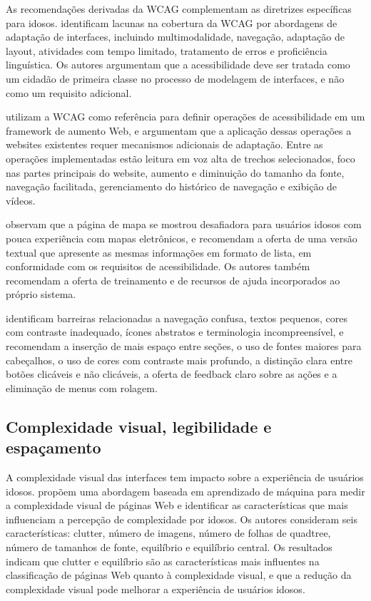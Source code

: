 \label{sec:recomendacoes_wcag}

As recomendações derivadas da WCAG complementam as diretrizes específicas para idosos. \cite{wickramathilaka2023addressing} identificam lacunas na cobertura da WCAG por abordagens de adaptação de interfaces, incluindo multimodalidade, navegação, adaptação de layout, atividades com tempo limitado, tratamento de erros e proficiência linguística. Os autores argumentam que a acessibilidade deve ser tratada como um cidadão de primeira classe no processo de modelagem de interfaces, e não como um requisito adicional.

\cite{gonzalez2025augmenting} utilizam a WCAG como referência para definir operações de acessibilidade em um framework de aumento Web, e argumentam que a aplicação dessas operações a websites existentes requer mecanismos adicionais de adaptação. Entre as operações implementadas estão leitura em voz alta de trechos selecionados, foco nas partes principais do website, aumento e diminuição do tamanho da fonte, navegação facilitada, gerenciamento do histórico de navegação e exibição de vídeos.

\cite{xie2010usability} observam que a página de mapa se mostrou desafiadora para usuários idosos com pouca experiência com mapas eletrônicos, e recomendam a oferta de uma versão textual que apresente as mesmas informações em formato de lista, em conformidade com os requisitos de acessibilidade. Os autores também recomendam a oferta de treinamento e de recursos de ajuda incorporados ao próprio sistema.

\cite{gatsou2017seniors} identificam barreiras relacionadas a navegação confusa, textos pequenos, cores com contraste inadequado, ícones abstratos e terminologia incompreensível, e recomendam a inserção de mais espaço entre seções, o uso de fontes maiores para cabeçalhos, o uso de cores com contraste mais profundo, a distinção clara entre botões clicáveis e não clicáveis, a oferta de feedback claro sobre as ações e a eliminação de menus com rolagem.

\subsection{Complexidade visual, legibilidade e espaçamento}

\label{sec:complexidade}

A complexidade visual das interfaces tem impacto sobre a experiência de usuários idosos. \cite{sadeghi2020hci} propõem uma abordagem baseada em aprendizado de máquina para medir a complexidade visual de páginas Web e identificar as características que mais influenciam a percepção de complexidade por idosos. Os autores consideram seis características: clutter, número de imagens, número de folhas de quadtree, número de tamanhos de fonte, equilíbrio e equilíbrio central. Os resultados indicam que clutter e equilíbrio são as características mais influentes na classificação de páginas Web quanto à complexidade visual, e que a redução da complexidade visual pode melhorar a experiência de usuários idosos.

